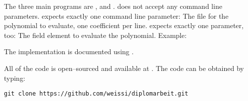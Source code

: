 %
%
\label{sec:usage}

The three main programs are \JWBpOne{}, \JWBpTwo{} and \JWBtoken{}. \JWBtoken{}
does not accept any command line parameters. \JWpOne{} expects exactly one
command line parameter: The file for the polynomial to evaluate, one coefficient
per line. \JWpTwo{} expects exactly one parameter, too: The field element to
evaluate the polynomial. Example:





%
%
\label{sec:implementation-doc}

The implementation is documented using \JWTLhaddock{}.



%
%
\label{sec:code-availability}

All of the code is open--sourced and available at
. The code can
be obtained by typing:

\begin{lstlisting}
git clone https://github.com/weissi/diplomarbeit.git
\end{lstlisting}


